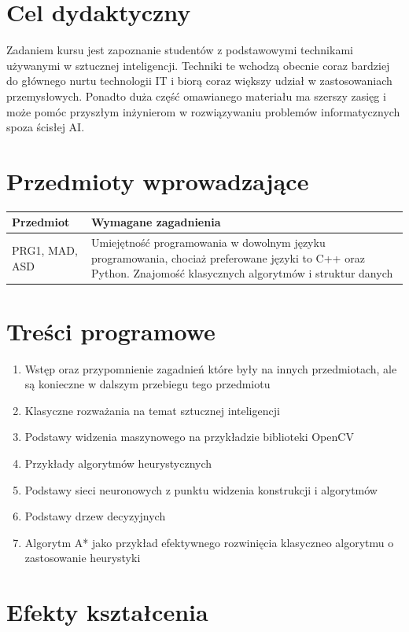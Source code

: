 \documentclass[12pt, a4paper]{article}
\begin{document}
\section{Cel dydaktyczny}

Zadaniem kursu jest zapoznanie studentów z podstawowymi technikami używanymi w sztucznej inteligencji. Techniki te wchodzą obecnie coraz bardziej do głównego nurtu technologii IT i biorą coraz większy udział w zastosowaniach przemysłowych. Ponadto duża część omawianego materiału ma szerszy zasięg i może pomóc przyszłym inżynierom w rozwiązywaniu problemów informatycznych spoza ścisłej AI.

\section{Przedmioty wprowadzające}

\begin{tabularx}{\textwidth}{lX}
  \hline
  \textbf{Przedmiot} & \textbf{Wymagane zagadnienia} \\
  \hline
  PRG1, MAD, ASD & Umiejętność programowania w dowolnym języku programowania, chociaż preferowane języki to C++ oraz Python. Znajomość klasycznych algorytmów i struktur danych \\
  \hline
\end{tabularx}

\section{Treści programowe}

\begin{enumerate}
  \item Wstęp oraz przypomnienie zagadnień które były na innych przedmiotach, ale są konieczne w dalszym przebiegu tego przedmiotu
  \item Klasyczne rozważania na temat sztucznej inteligencji
  \item Podstawy widzenia maszynowego na przykładzie biblioteki OpenCV
  \item Przykłady algorytmów heurystycznych
  \item Podstawy sieci neuronowych z punktu widzenia konstrukcji i algorytmów
  \item Podstawy drzew decyzyjnych
  \item Algorytm A* jako przykład efektywnego rozwinięcia klasyczneo algorytmu o zastosowanie heurystyki
\end{enumerate}

\section{Efekty kształcenia}
\end{document}
